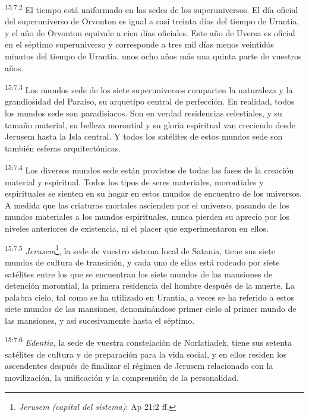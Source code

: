 \par
\textsuperscript{15:7.2} El tiempo está uniformado en las sedes de los superuniversos. El día oficial del superuniverso de Orvonton es igual a casi treinta días del tiempo de Urantia, y el año de Orvonton equivale a cien días oficiales. Este año de Uversa es oficial en el séptimo superuniverso y corresponde a tres mil días menos veintidós minutos del tiempo de Urantia, unos ocho años más una quinta parte de vuestros años.

\par
\textsuperscript{15:7.3} Los mundos sede de los siete superuniversos comparten la naturaleza y la grandiosidad del Paraíso, su arquetipo central de perfección. En realidad, todos los mundos sede son paradisiacos. Son en verdad residencias celestiales, y su tamaño material, su belleza morontial y su gloria espiritual van creciendo desde Jerusem hasta la Isla central. Y todos los satélites de estos mundos sede son también esferas arquitectónicas.

\par
\textsuperscript{15:7.4} Los diversos mundos sede están provistos de todas las fases de la creación material y espiritual. Todos los tipos de seres materiales, morontiales y espirituales se sienten en su hogar en estos mundos de encuentro de los universos. A medida que las criaturas mortales ascienden por el universo, pasando de los mundos materiales a los mundos espirituales, nunca pierden su aprecio por los niveles anteriores de existencia, ni el placer que experimentaron en ellos.

\par
\textsuperscript{15:7.5} \textit{Jerusem}\footnote{\textit{Jerusem (capital del sistema)}: Ap 21:2 ff.}, la sede de vuestro sistema local de Satania, tiene sus siete mundos de cultura de transición, y cada uno de ellos está rodeado por siete satélites entre los que se encuentran los siete mundos de las mansiones de detención morontial, la primera residencia del hombre después de la muerte. La palabra cielo, tal como se ha utilizado en Urantia, a veces se ha referido a estos siete mundos de las mansiones, denominándose primer cielo al primer mundo de las mansiones, y así sucesivamente hasta el séptimo.

\par
\textsuperscript{15:7.6} \textit{Edentia,} la sede de vuestra constelación de Norlatiadek, tiene sus setenta satélites de cultura y de preparación para la vida social, y en ellos residen los ascendentes después de finalizar el régimen de Jerusem relacionado con la movilización, la unificación y la comprensión de la personalidad.

